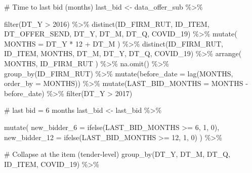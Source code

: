 \documentclass[
]{report}
\newenvironment{Shaded}{\begin{snugshade}}{\end{snugshade}}
\newcommand{\AttributeTok}[1]{\textcolor[rgb]{0.40,0.45,0.13}{#1}}
\newcommand{\CommentTok}[1]{\textcolor[rgb]{0.37,0.37,0.37}{#1}}
\newcommand{\DecValTok}[1]{\textcolor[rgb]{0.68,0.00,0.00}{#1}}
\newcommand{\FunctionTok}[1]{\textcolor[rgb]{0.28,0.35,0.67}{#1}}
\newcommand{\NormalTok}[1]{\textcolor[rgb]{0.00,0.23,0.31}{#1}}
\newcommand{\OtherTok}[1]{\textcolor[rgb]{0.00,0.23,0.31}{#1}}
\newcommand{\SpecialCharTok}[1]{\textcolor[rgb]{0.37,0.37,0.37}{#1}}
\begin{document}
\begin{Shaded}
\begin{Highlighting}[]
\CommentTok{\# Time to last bid (months)}
\NormalTok{last\_bid }\OtherTok{\textless{}{-}}\NormalTok{ data\_offer\_sub }\SpecialCharTok{\%\textgreater{}\%} 
  
  \FunctionTok{filter}\NormalTok{(DT\_Y }\SpecialCharTok{\textgreater{}} \DecValTok{2016}\NormalTok{) }\SpecialCharTok{\%\textgreater{}\%} 
  \FunctionTok{distinct}\NormalTok{(ID\_FIRM\_RUT, ID\_ITEM, DT\_OFFER\_SEND, DT\_Y, DT\_M, DT\_Q, COVID\_19) }\SpecialCharTok{\%\textgreater{}\%} 
  \FunctionTok{mutate}\NormalTok{(}
    \AttributeTok{MONTHS =}\NormalTok{ DT\_Y }\SpecialCharTok{*} \DecValTok{12} \SpecialCharTok{+}\NormalTok{ DT\_M}
\NormalTok{  ) }\SpecialCharTok{\%\textgreater{}\%} 
  \FunctionTok{distinct}\NormalTok{(ID\_FIRM\_RUT, ID\_ITEM, MONTHS, DT\_M, DT\_Y, DT\_Q, COVID\_19) }\SpecialCharTok{\%\textgreater{}\%} 
  \FunctionTok{arrange}\NormalTok{(}
\NormalTok{    MONTHS, ID\_FIRM\_RUT}
\NormalTok{  ) }\SpecialCharTok{\%\textgreater{}\%} 
  \FunctionTok{na.omit}\NormalTok{() }\SpecialCharTok{\%\textgreater{}\%} 
  \FunctionTok{group\_by}\NormalTok{(ID\_FIRM\_RUT) }\SpecialCharTok{\%\textgreater{}\%} 
  \FunctionTok{mutate}\NormalTok{(}\AttributeTok{before\_date =} \FunctionTok{lag}\NormalTok{(MONTHS, }\AttributeTok{order\_by =}\NormalTok{ MONTHS)) }\SpecialCharTok{\%\textgreater{}\%}  
  \FunctionTok{mutate}\NormalTok{(}\AttributeTok{LAST\_BID\_MONTHS =}\NormalTok{ MONTHS }\SpecialCharTok{{-}}\NormalTok{ before\_date) }\SpecialCharTok{\%\textgreater{}\%} 
  \FunctionTok{filter}\NormalTok{(DT\_Y }\SpecialCharTok{\textgreater{}} \DecValTok{2017}\NormalTok{)}

\CommentTok{\# last bid = 6 months}
\NormalTok{last\_bid }\OtherTok{\textless{}{-}}\NormalTok{ last\_bid }\SpecialCharTok{\%\textgreater{}\%} 

  \FunctionTok{mutate}\NormalTok{(}
    \AttributeTok{new\_bidder\_6  =} \FunctionTok{ifelse}\NormalTok{(LAST\_BID\_MONTHS }\SpecialCharTok{\textgreater{}=} \DecValTok{6}\NormalTok{, }\DecValTok{1}\NormalTok{, }\DecValTok{0}\NormalTok{),}
    \AttributeTok{new\_bidder\_12 =} \FunctionTok{ifelse}\NormalTok{(LAST\_BID\_MONTHS }\SpecialCharTok{\textgreater{}=} \DecValTok{12}\NormalTok{, }\DecValTok{1}\NormalTok{, }\DecValTok{0}\NormalTok{)}
\NormalTok{    ) }\SpecialCharTok{\%\textgreater{}\%} 
  
    \CommentTok{\# Collapse at the item (tender{-}level)}
  \FunctionTok{group\_by}\NormalTok{(DT\_Y, DT\_M, DT\_Q, ID\_ITEM, COVID\_19) }\SpecialCharTok{\%\textgreater{}\%} 
  

\end{Highlighting}
\end{Shaded}
\end{document}
